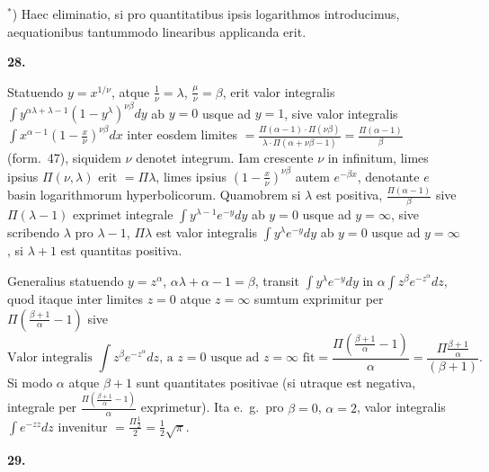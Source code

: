 \documentclass[12pt,a4paper]{article}
\newcommand{\art}[1]{\par\medskip\noindent\textbf{#1.}\par\nopagebreak\smallskip}
\begin{document}
\vspace{0.5em}
\noindent$^*$) Haec eliminatio, si pro quantitatibus ipsis logarithmos introducimus, aequationibus tantummodo linearibus applicanda erit.

\art{28}

Statuendo $y=x^{1/\nu}$, atque $\frac{1}{\nu}=\lambda$, $\frac{\mu}{\nu}=\beta$, erit valor integralis $\int\!y^{\alpha\lambda+\lambda-1}(1-y^\lambda)^{\nu\beta}dy$ ab $y=0$ usque ad $y=1$, sive valor integralis $\int\!x^{\alpha-1}(1-\frac{x}{\nu})^{\nu\beta}dx$ inter eosdem limites $=\frac{\Pi(\alpha-1)\cdot\Pi(\nu\beta)}{\lambda\cdot\Pi(\alpha+\nu\beta-1)} = \frac{\Pi(\alpha-1)}{\beta}$ (form.\ 47), siquidem $\nu$ denotet integrum. Iam crescente $\nu$ in infinitum, limes ipsius $\Pi(\nu,\lambda)$ erit $=\Pi\lambda$, limes ipsius $(1-\frac{x}{\nu})^{\nu\beta}$ autem $e^{-\beta x}$, denotante $e$ basin logarithmorum hyperbolicorum. Quamobrem si $\lambda$ est positiva, $\frac{\Pi(\alpha-1)}{\beta}$ sive $\Pi(\lambda-1)$ exprimet integrale $\int\!y^{\lambda-1}e^{-y}dy$ ab $y=0$ usque ad $y=\infty$, sive scribendo $\lambda$ pro $\lambda-1$, $\Pi\lambda$ est valor integralis $\int\!y^\lambda e^{-y}dy$ ab $y=0$ usque ad $y=\infty$, si $\lambda+1$ est quantitas positiva.

Generalius statuendo $y=z^\alpha$, $\alpha\lambda+\alpha-1=\beta$, transit $\int\!y^\lambda e^{-y}dy$ in $\alpha\int\!z^\beta e^{-z^\alpha}dz$, quod itaque inter limites $z=0$ atque $z=\infty$ sumtum exprimitur per $\Pi(\frac{\beta+1}{\alpha}-1)$
sive
\begin{equation}
\text{Valor integralis }\int\!z^\beta e^{-z^\alpha}dz\text{, a }z=0\text{ usque ad }z=\infty\text{ fit} = \frac{\Pi(\frac{\beta+1}{\alpha}-1)}{\alpha} = \frac{\Pi\frac{\beta+1}{\alpha}}{(\beta+1)}.\tag{[art.\ 28]}
\end{equation}
Si modo $\alpha$ atque $\beta+1$ sunt quantitates positivae (si utraque est negativa, integrale per $\frac{\Pi(\frac{\beta+1}{\alpha}-1)}{\alpha}$ exprimetur). Ita e.\ g.\ pro $\beta=0$, $\alpha=2$, valor integralis $\int\!e^{-zz}dz$ invenitur $=\frac{\Pi\frac{1}{2}}{2}=\frac{1}{2}\surd\pi$.

\art{29}
\end{document}
